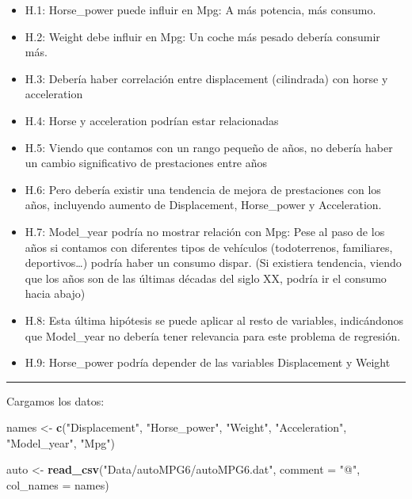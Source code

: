 \documentclass[
]{article}
\newenvironment{Shaded}{\begin{snugshade}}{\end{snugshade}}
\newcommand{\DataTypeTok}[1]{\textcolor[rgb]{0.13,0.29,0.53}{#1}}
\newcommand{\KeywordTok}[1]{\textcolor[rgb]{0.13,0.29,0.53}{\textbf{#1}}}
\newcommand{\NormalTok}[1]{#1}
\newcommand{\StringTok}[1]{\textcolor[rgb]{0.31,0.60,0.02}{#1}}
\providecommand{\tightlist}{%
  \setlength{\itemsep}{0pt}\setlength{\parskip}{0pt}}
\begin{document}
\begin{itemize}
\tightlist
\item
  H.1: Horse\_power puede influir en Mpg: A más potencia, más consumo.
\item
  H.2: Weight debe influir en Mpg: Un coche más pesado debería consumir
  más.
\item
  H.3: Debería haber correlación entre displacement (cilindrada) con
  horse y acceleration
\item
  H.4: Horse y acceleration podrían estar relacionadas
\item
  H.5: Viendo que contamos con un rango pequeño de años, no debería
  haber un cambio significativo de prestaciones entre años
\item
  H.6: Pero debería existir una tendencia de mejora de prestaciones con
  los años, incluyendo aumento de Displacement, Horse\_power y
  Acceleration.
\item
  H.7: Model\_year podría no mostrar relación con Mpg: Pese al paso de
  los años si contamos con diferentes tipos de vehículos (todoterrenos,
  familiares, deportivos\ldots) podría haber un consumo dispar. (Si
  existiera tendencia, viendo que los años son de las últimas décadas
  del siglo XX, podría ir el consumo hacia abajo)
\item
  H.8: Esta última hipótesis se puede aplicar al resto de variables,
  indicándonos que Model\_year no debería tener relevancia para este
  problema de regresión.
\item
  H.9: Horse\_power podría depender de las variables Displacement y
  Weight
\end{itemize}

\begin{center}\rule{0.5\linewidth}{0.5pt}\end{center}

Cargamos los datos:

\begin{Shaded}
\begin{Highlighting}[]
\NormalTok{names <-}\StringTok{ }\KeywordTok{c}\NormalTok{(}\StringTok{"Displacement"}\NormalTok{, }\StringTok{"Horse_power"}\NormalTok{, }\StringTok{"Weight"}\NormalTok{, }\StringTok{"Acceleration"}\NormalTok{, }\StringTok{"Model_year"}\NormalTok{, }\StringTok{"Mpg"}\NormalTok{)}

\NormalTok{auto <-}\StringTok{ }\KeywordTok{read_csv}\NormalTok{(}\StringTok{"Data/autoMPG6/autoMPG6.dat"}\NormalTok{, }\DataTypeTok{comment =} \StringTok{"@"}\NormalTok{, }\DataTypeTok{col_names =}\NormalTok{ names)}
\end{Highlighting}
\end{Shaded}
\end{document}

